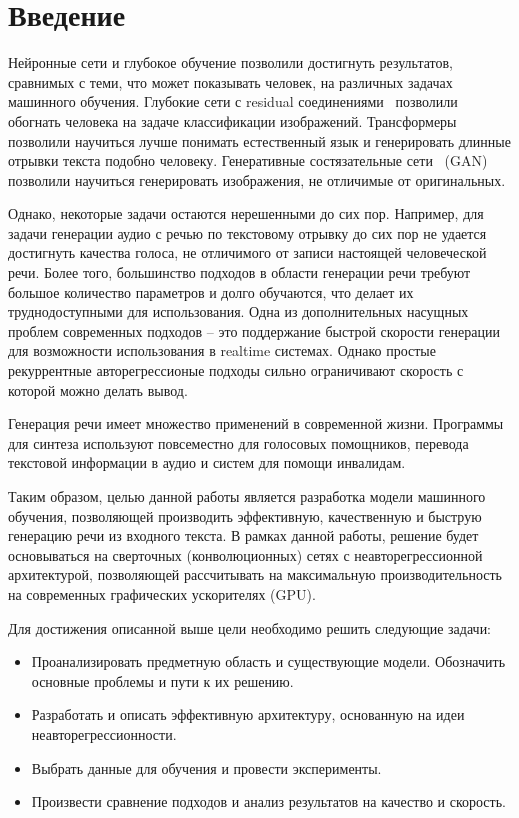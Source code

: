 \section*{Введение}

Нейронные сети и глубокое обучение позволили достигнуть результатов, сравнимых с теми, что может показывать человек, на различных задачах машинного обучения. Глубокие сети с residual соединениями~\cite{he2015deep} позволили обогнать человека на задаче классификации изображений. Трансформеры~\cite{attention-is-all} позволили научиться лучше понимать естественный язык и генерировать длинные отрывки текста подобно человеку. Генеративные состязательные сети~\cite{goodfellow2014generative} (GAN) позволили научиться генерировать изображения, не отличимые от оригинальных.

Однако, некоторые задачи остаются нерешенными до сих пор. Например, для задачи генерации аудио с речью по текстовому отрывку до сих пор не удается достигнуть качества голоса, не отличимого от записи настоящей человеческой речи. Более того, большинство подходов в области генерации речи требуют большое количество параметров и долго обучаются, что делает их труднодоступными для использования. Одна из дополнительных насущных проблем современных подходов -- это поддержание быстрой скорости генерации для возможности использования в realtime системах. Однако простые рекуррентные авторегрессионые подходы сильно ограничивают скорость с которой можно делать вывод.

Генерация речи имеет множество применений в современной жизни. Программы для синтеза используют повсеместно для голосовых помощников, перевода текстовой информации в аудио и систем для помощи инвалидам.

Таким образом, целью данной работы является разработка модели машинного обучения, позволяющей производить эффективную, качественную и быструю генерацию речи из входного текста. В рамках данной работы, решение будет основываться на сверточных (конволюционных) сетях с неавторегрессионной архитектурой, позволяющей рассчитывать на максимальную производительность на современных графических ускорителях (GPU).

Для достижения описанной выше цели необходимо решить следующие задачи:
\begin{itemize}
    \item Проанализировать предметную область и существующие модели. Обозначить основные проблемы и пути к их решению.
    \item Разработать и описать эффективную архитектуру, основанную на идеи неавторегрессионности.
    \item Выбрать данные для обучения и провести эксперименты.
    \item Произвести сравнение подходов и анализ результатов на качество и скорость.
\end{itemize}


